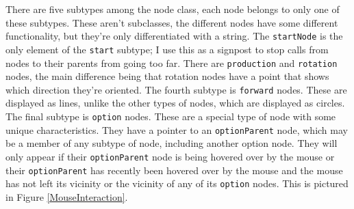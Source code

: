 \documentclass[12pt,twoside]{reedthesis}
\newcommand{\code}[1]{\texttt{#1}}
\begin{document}
	There are five subtypes among the node class, each node belongs to only one of these subtypes. These aren't subclasses, the different nodes have some different functionality, but they're only differentiated with a string. The \code{startNode} is the only element of the \code{start} subtype; I use this as a signpost to stop calls from nodes to their parents from going too far. There are \code{production} and \code{rotation} nodes, the main difference being that rotation nodes have a point that shows which direction they're oriented. The fourth subtype is \code{forward} nodes. These are displayed as lines, unlike the other types of nodes, which are displayed as circles. The final subtype is \code{option} nodes. These are a special type of node with some unique characteristics. They have a pointer to an \code{optionParent} node, which may be a member of any subtype of node, including another option node. They will only appear if their \code{optionParent} node is being hovered over by the mouse or their \code{optionParent} has recently been hovered over by the mouse and the mouse has not left its vicinity or the vicinity of any of its \code{option} nodes. This is pictured in Figure \ref{MouseInteraction}.
	
\end{document}
